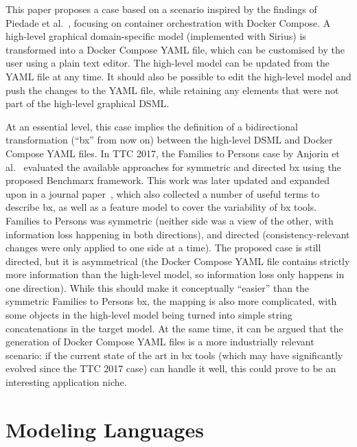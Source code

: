 \documentclass[twocolumn]{ceurart}
\begin{document}
This paper proposes a case based on a scenario inspired by the findings of
Piedade et al.~\cite{piedade_visual_2022}, focusing on container orchestration
with Docker Compose. A high-level graphical domain-specific model (implemented
with Sirius) is transformed into a Docker Compose YAML file, which can be
customised by the user using a plain text editor. The high-level model can be
updated from the YAML file at any time. It should also be possible to edit the
high-level model and push the changes to the YAML file, while retaining any
elements that were not part of the high-level graphical DSML.

At an essential level, this case implies the definition of a bidirectional
transformation (``bx'' from now on) between the high-level DSML and Docker
Compose YAML files. In TTC 2017, the Families to Persons case by Anjorin et
al.~\cite{anjorin_families_2017} evaluated the available approaches for
symmetric and directed bx using the proposed Benchmarx framework. This work was
later updated and expanded upon in a journal
paper~\cite{anjorin_benchmarking_2020}, which also collected a number of useful
terms to describe bx, as well as a feature model to cover the variability of bx
tools. Families to Persons was symmetric (neither side was a view of the other,
with information loss happening in both directions), and directed
(consistency-relevant changes were only applied to one side at a time). The
proposed case is still directed, but it is asymmetrical (the Docker Compose YAML
file contains strictly more information than the high-level model, so
information loss only happens in one direction). While this should make it
conceptually ``easier'' than the symmetric Families to Persons bx, the mapping
is also more complicated, with some objects in the high-level model being turned
into simple string concatenations in the target model. At the same time, it can
be argued that the generation of Docker Compose YAML files is a more
industrially relevant scenario: if the current state of the art in bx tools
(which may have significantly evolved since the TTC 2017 case) can handle it
well, this could prove to be an interesting application niche.

\section{Modeling Languages}
\end{document}
